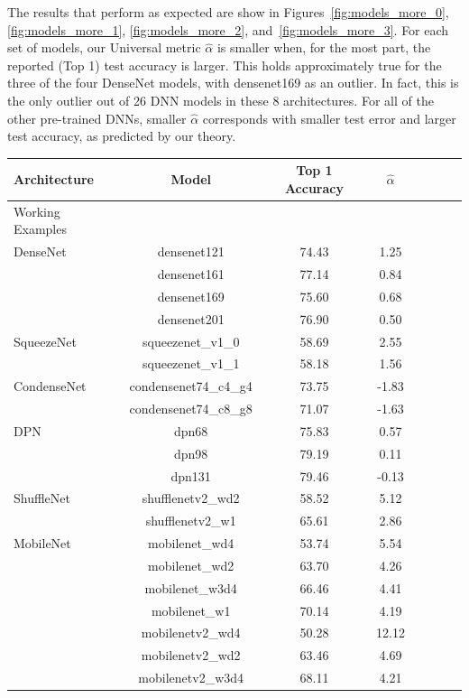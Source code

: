 {The results that perform as expected are show in
Figures~\ref{fig:models_more_0}, 
\ref{fig:models_more_1}, 
\ref{fig:models_more_2}, 
and~\ref{fig:models_more_3}.
For each set of models, our Universal metric $\hat{\alpha}$
is smaller when, for the most part, the reported (Top 1)
test accuracy is larger. 
This holds approximately
true for the three of the four DenseNet models, with
densenet169 as an outlier. 
In fact, this is the only
outlier out of 26 DNN models in these 8 architectures.
For all of the other pre-trained DNNs, smaller
$\hat{\alpha}$ corresponds with smaller test error
and larger test accuracy, as predicted by our theory.

\begin{table}[!htb]
\small
\begin{center}
\begin{tabular}{|p{1in}|c|c|c|c|c|c|c|}
\hline
Architecture 
 & Model
 & Top 1 Accuracy & $\hat{\alpha} $\\
 \hline
 Working Examples & & & \\
 \hline
 DenseNet
& densenet121 & 74.43 & 1.25 \\
& densenet161 & 77.14 & 0.84 \\
& densenet169 & 75.60 & 0.68 \\
& densenet201 & 76.90 & 0.50 \\
\hline
SqueezeNet
& squeezenet\_v1\_0 & 58.69 & 2.55 \\
& squeezenet\_v1\_1 & 58.18 & 1.56 \\
\hline
CondenseNet
& condensenet74\_c4\_g4 & 73.75 & -1.83 \\
& condensenet74\_c8\_g8 & 71.07 & -1.63 \\
\hline
DPN
& dpn68 & 75.83 & 0.57 \\
& dpn98 & 79.19 & 0.11 \\
& dpn131 & 79.46 & -0.13 \\
\hline
ShuffleNet
& shufflenetv2\_wd2 & 58.52 & 5.12 \\
& shufflenetv2\_w1 & 65.61 & 2.86 \\
\hline
MobileNet
& mobilenet\_wd4 & 53.74 & 5.54 \\
& mobilenet\_wd2 & 63.70 & 4.26 \\
& mobilenet\_w3d4 & 66.46 & 4.41 \\
& mobilenet\_w1 & 70.14 & 4.19 \\
& mobilenetv2\_wd4 & 50.28 & 12.12 \\
& mobilenetv2\_wd2 & 63.46 & 4.69 \\
& mobilenetv2\_w3d4 & 68.11 & 4.21 \\

\end{tabular}
\end{center}
\end{table}}
